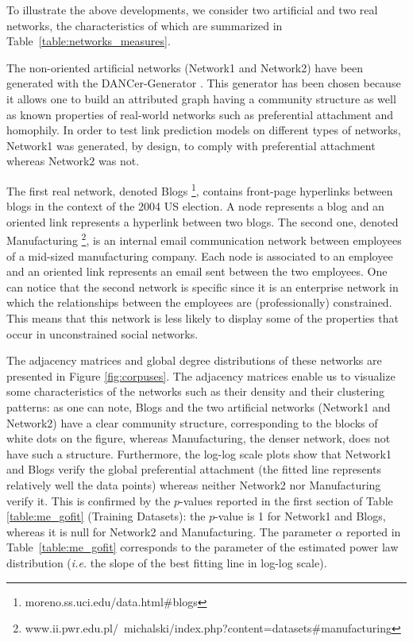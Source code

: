 To illustrate the above developments, we consider two artificial and two real networks, the characteristics of which are summarized in Table~\ref{table:networks_measures}.



The non-oriented artificial networks (Network1 and Network2) have been generated with the DANCer-Generator \cite{largeron2015}. This generator has been chosen because it allows one to build an attributed graph having a community structure as well as known properties of real-world networks such as preferential attachment and homophily. In order to test link prediction models on different types of networks, Network1 was generated, by design, to comply with preferential attachment whereas Network2 was not.

The first real network, denoted Blogs \footnote{moreno.ss.uci.edu/data.html\#blogs}, contains front-page hyperlinks between blogs in the context of the 2004 US election. A node represents a blog and an oriented link represents a hyperlink between two blogs. The second one, denoted Manufacturing \footnote{www.ii.pwr.edu.pl/~michalski/index.php?content=datasets\#manufacturing}, is an internal email communication network between employees of a mid-sized manufacturing company. Each node is associated to an employee and an oriented link represents an email sent between the two employees. One can notice that the second network is specific since it is an enterprise network in which the relationships between the employees are (professionally) constrained. This means that this network is less likely to display some of the properties that occur in unconstrained social networks.

The adjacency matrices and global degree distributions of these networks are presented in Figure \ref{fig:corpuses}. The adjacency matrices enable us to visualize some characteristics of the networks such as their density and their clustering patterns: as one can note, Blogs and the two artificial networks (Network1 and Network2) have a clear community structure, corresponding to the blocks of white dots on the figure, whereas Manufacturing, the denser network, does not have such a structure. Furthermore, the log-log scale plots show that Network1 and Blogs verify the  global preferential attachment (the fitted line represents relatively well the data points) whereas neither Network2 nor Manufacturing verify it. This is confirmed by the $p$-values reported in the first section of Table \ref{table:me_gofit} (Training Datasets): the $p$-value is 1 for Network1 and Blogs, whereas it is null for Network2 and Manufacturing. The parameter $\alpha$ reported in Table~\ref{table:me_gofit} corresponds to the parameter of the estimated power law distribution (\textit{i.e.} the slope of the best fitting line in log-log scale).

